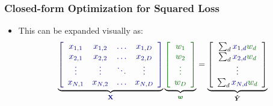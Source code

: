 \documentclass[trans]{beamer}
\begin{document}
\begin{frame}
  \frametitle{Closed-form Optimization for Squared Loss}
\begin{itemize}
\item 
This can be expanded visually as:
%
\begin{equation}
\underbrace{
\textcolor{darkblue}{
\left[
\begin{array}{cccc}
  x_{1,1} & x_{1,2} & \dots & x_{1,D} \\
  x_{2,1} & x_{2,2} & \dots & x_{2,D} \\
  \vdots & \vdots & \ddots & \vdots \\
  x_{N,1} & x_{N,2} & \dots & x_{N,D}
\end{array}
\right]
}}_{\textcolor{darkblue}{\mat X}}
\underbrace{
\textcolor{darkergreen}{
\left[
\begin{array}{c}
  w_{1} \\
  w_{2} \\ 
  \vdots \\
  w_{D}
\end{array}
\right]
}}_{\textcolor{darkergreen}{\vec w}}
=
\underbrace{
\left[
\begin{array}{c}
  \sum_d \textcolor{darkblue}{x_{1,d}} \textcolor{darkergreen}{w_d} \\
  \sum_d \textcolor{darkblue}{x_{2,d}} \textcolor{darkergreen}{w_d} \\
  \vdots \\
  \sum_d \textcolor{darkblue}{x_{N,d}} \textcolor{darkergreen}{w_d}
\end{array}
\right]
}_{\vec{\hat Y}}
\end{equation}
\end{itemize}
\end{frame}
\end{document}
